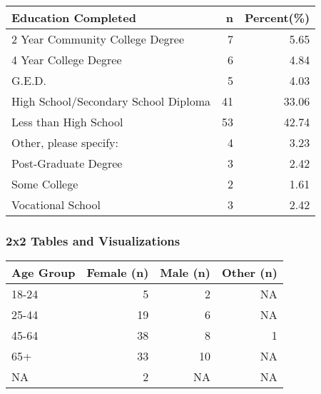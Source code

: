 \documentclass[]{article}
\newenvironment{Shaded}{\begin{snugshade}}{\end{snugshade}}
\newcommand{\DataTypeTok}[1]{\textcolor[rgb]{0.13,0.29,0.53}{#1}}
\newcommand{\KeywordTok}[1]{\textcolor[rgb]{0.13,0.29,0.53}{\textbf{#1}}}
\newcommand{\NormalTok}[1]{#1}
\newcommand{\OperatorTok}[1]{\textcolor[rgb]{0.81,0.36,0.00}{\textbf{#1}}}
\newcommand{\StringTok}[1]{\textcolor[rgb]{0.31,0.60,0.02}{#1}}
\begin{document}
\begin{longtable}[]{@{}lrr@{}}
\toprule
Education Completed & n & Percent(\%)\tabularnewline
\midrule
\endhead
2 Year Community College Degree & 7 & 5.65\tabularnewline
4 Year College Degree & 6 & 4.84\tabularnewline
G.E.D. & 5 & 4.03\tabularnewline
High School/Secondary School Diploma & 41 & 33.06\tabularnewline
Less than High School & 53 & 42.74\tabularnewline
Other, please specify: & 4 & 3.23\tabularnewline
Post-Graduate Degree & 3 & 2.42\tabularnewline
Some College & 2 & 1.61\tabularnewline
Vocational School & 3 & 2.42\tabularnewline
\bottomrule
\end{longtable}

\hypertarget{x2-tables-and-visualizations}{%
\subsubsection{2x2 Tables and
Visualizations}\label{x2-tables-and-visualizations}}

\begin{Shaded}
\end{Shaded}

\begin{longtable}[]{@{}lrrr@{}}
\toprule
Age Group & Female (n) & Male (n) & Other (n)\tabularnewline
\midrule
\endhead
18-24 & 5 & 2 & NA\tabularnewline
25-44 & 19 & 6 & NA\tabularnewline
45-64 & 38 & 8 & 1\tabularnewline
65+ & 33 & 10 & NA\tabularnewline
NA & 2 & NA & NA\tabularnewline
\bottomrule
\end{longtable}
\end{document}
